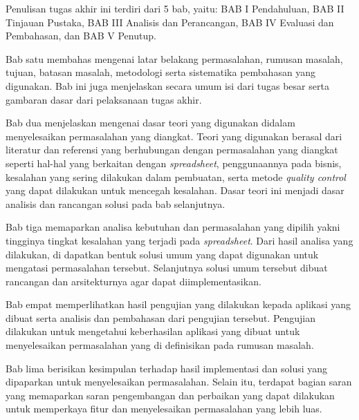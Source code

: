 Penulisan tugas akhir ini terdiri dari 5 bab, yaitu: BAB I Pendahuluan, BAB II Tinjauan Pustaka, BAB III Analisis dan Perancangan, BAB IV Evaluasi dan Pembahasan, dan BAB V Penutup. 

Bab satu membahas mengenai latar belakang permasalahan, rumusan masalah, tujuan, batasan masalah, metodologi serta sistematika pembahasan yang digunakan. Bab ini juga menjelaskan secara umum isi dari tugas besar serta gambaran dasar dari pelaksanaan tugas akhir.

Bab dua menjelaskan mengenai dasar teori yang digunakan didalam menyelesaikan permasalahan yang diangkat. Teori yang digunakan berasal dari literatur dan referensi yang berhubungan dengan permasalahan yang diangkat seperti hal-hal yang berkaitan dengan \textit{spreadsheet}, penggunaannya pada bisnis, kesalahan yang sering dilakukan dalam pembuatan, serta metode \textit{quality control} yang dapat dilakukan untuk mencegah kesalahan. Dasar teori ini menjadi dasar analisis dan rancangan solusi pada bab selanjutnya.

Bab tiga memaparkan analisa kebutuhan dan permasalahan yang dipilih yakni tingginya tingkat kesalahan yang terjadi pada \textit{spreadsheet}. Dari hasil analisa yang dilakukan, di dapatkan bentuk solusi umum yang dapat digunakan untuk mengatasi permasalahan tersebut. Selanjutnya solusi umum tersebut dibuat rancangan dan arsitekturnya agar dapat diimplementasikan.

Bab empat memperlihatkan hasil pengujian yang dilakukan kepada aplikasi yang dibuat serta analisis dan pembahasan dari pengujian tersebut. Pengujian dilakukan untuk mengetahui keberhasilan aplikasi yang dibuat untuk menyelesaikan permasalahan yang di definisikan pada rumusan masalah.

Bab lima berisikan kesimpulan terhadap hasil implementasi dan solusi yang dipaparkan untuk menyelesaikan permasalahan. Selain itu, terdapat bagian saran yang memaparkan saran pengembangan dan perbaikan yang dapat dilakukan untuk memperkaya fitur dan menyelesaikan permasalahan yang lebih luas.